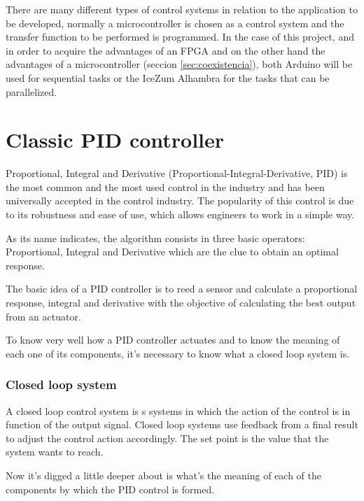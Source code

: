 There are many different types of control systems in relation to the application to be developed, normally a microcontroller is chosen as a control system and the transfer function to be performed is programmed.\newline
In the case of this project, and in order to acquire the advantages of an FPGA and on the other hand the advantages of a microcontroller (seccion \ref{sec:coexistencia}), both Arduino will be used for sequential tasks or the IceZum Alhambra for the tasks that can be parallelized. \newline
\section{Classic PID controller}\label{sec:PID}

Proportional, Integral and Derivative (Proportional-Integral-Derivative, PID) \cite{nemadesign} is the most common and the most used control in the industry and has been universally accepted in the control industry. The popularity of this control is due to its robustness and ease of use, which allows engineers to work in a simple way. \newline

As its name indicates, the algorithm consists in three basic operators: Proportional, Integral and Derivative which are the clue to obtain an optimal response. \newline

The basic idea of a PID controller is to reed a sensor and calculate a proportional response, integral and derivative with the objective of calculating the best output from an actuator. \newline

To know very well how a PID controller actuates and to know the meaning of each one of its components, it’s necessary to know what a closed loop system is. 

\subsubsection{Closed loop system}
A closed loop control system is s systems in which the action of the control is in function of the output signal. Closed loop systems use feedback from a final result to adjust the control action accordingly. The set point is the value that the system wants to reach. \newline

Now it’s digged a little deeper about is what’s the meaning of each of the components by which the PID control is formed.\newline

